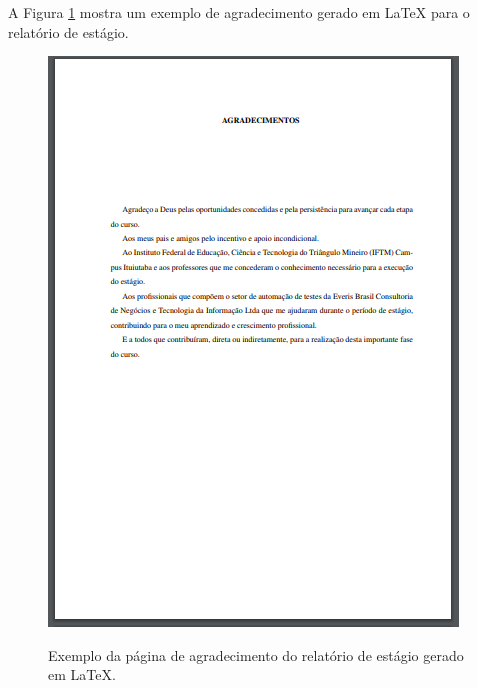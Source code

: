 \newpage
A Figura \ref{agradest} mostra um exemplo de agradecimento gerado em LaTeX para o relatório de estágio.\\
\begin{figure}[h]
	\centering
	\includegraphics{imagens/relatorioEstagio/Agradecimento.png}\\
	\caption{Exemplo da página de agradecimento do relatório de estágio gerado em LaTeX.}
	\label{agradest}
\end{figure}

